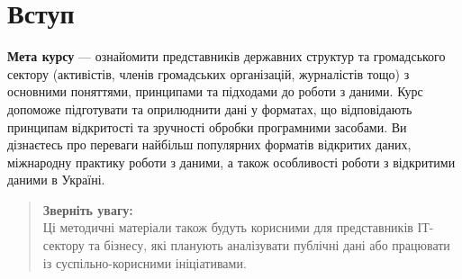 \chapter{Вступ}
\label{sec:introduction}

\textbf{Мета курсу} — ознайомити представників державних структур та громадського сектору (активістів, членів громадських організацій, журналістів тощо) з основними поняттями, принципами та підходами до роботи з даними. Курс допоможе підготувати та оприлюднити дані у форматах, що відповідають принципам відкритості та зручності обробки програмними засобами. Ви дізнаєтесь про переваги найбільш популярних форматів відкритих даних, міжнародну практику роботи з даними, а також особливості роботи з відкритими даними в Україні.

\begin{quote}
\textbf{Зверніть увагу:}\\
Ці методичні матеріали також будуть корисними для представників ІТ-сектору та бізнесу, які планують аналізувати публічні дані або працювати із суспільно-корисними ініціативами.
\end{quote}